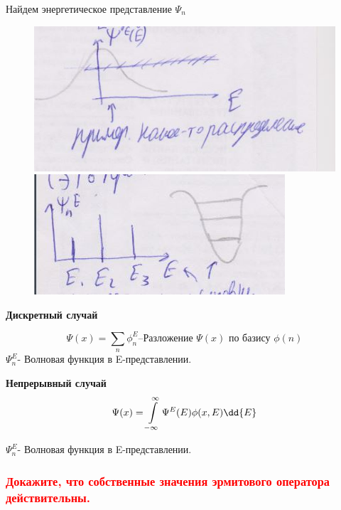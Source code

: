 Найдем энергетическое представление $\Psi_n$
\begin{figure}
\begin{minipage}{0.5\linewidth}
\includegraphics[width=\linewidth]{fig/fig152}
\caption{}
\vspace{-17pt}
\end{minipage}

\begin{minipage}{0.5\linewidth}
\includegraphics[width=\linewidth]{fig/fig151}
\caption{}
\vspace{-17pt}
\end{minipage}
\end{figure}
\textbf{Дискретный случай}

$$\Psi(x)=\sum\limits_n \phi_n^E \text{--Разложение $\Psi(x)$ по базису $\phi(n)$} $$
$\Psi_n^E$- Волновая функция в E-представлении.


\textbf{Непрерывный случай }
$$\Psi(x)=\infint \Psi^E(E)\phi(x,E)\dd{E} $$

$\Psi_n^E$- Волновая функция в E-представлении.

\subsubsection{\textcolor{red} {Докажите, что собственные значения эрмитового оператора действительны.} }


